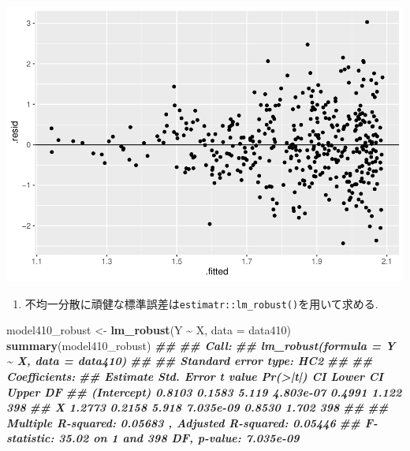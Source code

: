 \documentclass[
]{book}
\newenvironment{Shaded}{\begin{snugshade}}{\end{snugshade}}
\newcommand{\AttributeTok}[1]{\textcolor[rgb]{0.13,0.29,0.53}{#1}}
\newcommand{\DocumentationTok}[1]{\textcolor[rgb]{0.56,0.35,0.01}{\textbf{\textit{#1}}}}
\newcommand{\FunctionTok}[1]{\textcolor[rgb]{0.13,0.29,0.53}{\textbf{#1}}}
\newcommand{\NormalTok}[1]{#1}
\newcommand{\OtherTok}[1]{\textcolor[rgb]{0.56,0.35,0.01}{#1}}
\newcommand{\SpecialCharTok}[1]{\textcolor[rgb]{0.81,0.36,0.00}{\textbf{#1}}}
\providecommand{\tightlist}{%
  \setlength{\itemsep}{0pt}\setlength{\parskip}{0pt}}
\begin{document}
\includegraphics{_main_files/figure-latex/unnamed-chunk-20-1.pdf}

\begin{enumerate}
\def\labelenumi{(\arabic{enumi})}
\setcounter{enumi}{2}
\tightlist
\item
  不均一分散に頑健な標準誤差は\texttt{estimatr::lm\_robust()}を用いて求める.
\end{enumerate}

\begin{Shaded}
\begin{Highlighting}[]
\NormalTok{model410\_robust }\OtherTok{\textless{}{-}} \FunctionTok{lm\_robust}\NormalTok{(Y }\SpecialCharTok{\textasciitilde{}}\NormalTok{ X, }\AttributeTok{data =}\NormalTok{ data410)}
\FunctionTok{summary}\NormalTok{(model410\_robust)}
\DocumentationTok{\#\# }
\DocumentationTok{\#\# Call:}
\DocumentationTok{\#\# lm\_robust(formula = Y \textasciitilde{} X, data = data410)}
\DocumentationTok{\#\# }
\DocumentationTok{\#\# Standard error type:  HC2 }
\DocumentationTok{\#\# }
\DocumentationTok{\#\# Coefficients:}
\DocumentationTok{\#\#             Estimate Std. Error t value  Pr(\textgreater{}|t|) CI Lower CI Upper  DF}
\DocumentationTok{\#\# (Intercept)   0.8103     0.1583   5.119 4.803e{-}07   0.4991    1.122 398}
\DocumentationTok{\#\# X             1.2773     0.2158   5.918 7.035e{-}09   0.8530    1.702 398}
\DocumentationTok{\#\# }
\DocumentationTok{\#\# Multiple R{-}squared:  0.05683 ,   Adjusted R{-}squared:  0.05446 }
\DocumentationTok{\#\# F{-}statistic: 35.02 on 1 and 398 DF,  p{-}value: 7.035e{-}09}
\end{Highlighting}
\end{Shaded}
\end{document}
